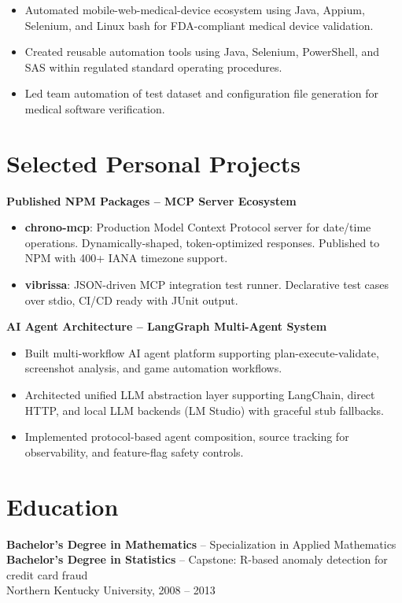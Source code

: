 \documentclass[11pt]{article}
\begin{document}
\begin{itemize}[leftmargin=*,nosep]
\item Automated mobile-web-medical-device ecosystem using Java, Appium, Selenium, and Linux bash for FDA-compliant medical device validation.
\item Created reusable automation tools using Java, Selenium, PowerShell, and SAS within regulated standard operating procedures.
\item Led team automation of test dataset and configuration file generation for medical software verification.
\end{itemize}

\section{Selected Personal Projects}

\textbf{Published NPM Packages -- MCP Server Ecosystem}

\begin{itemize}[leftmargin=*,nosep]
\item \textbf{chrono-mcp}: Production Model Context Protocol server for date/time operations. Dynamically-shaped, token-optimized responses. Published to NPM with 400+ IANA timezone support.
\item \textbf{vibrissa}: JSON-driven MCP integration test runner. Declarative test cases over stdio, CI/CD ready with JUnit output.
\end{itemize}

\textbf{AI Agent Architecture -- LangGraph Multi-Agent System}

\begin{itemize}[leftmargin=*,nosep]
\item Built multi-workflow AI agent platform supporting plan-execute-validate, screenshot analysis, and game automation workflows.
\item Architected unified LLM abstraction layer supporting LangChain, direct HTTP, and local LLM backends (LM Studio) with graceful stub fallbacks.
\item Implemented protocol-based agent composition, source tracking for observability, and feature-flag safety controls.
\end{itemize}

\section{Education}

\textbf{Bachelor's Degree in Mathematics} -- Specialization in Applied Mathematics\\
\textbf{Bachelor's Degree in Statistics} -- Capstone: R-based anomaly detection for credit card fraud\\
Northern Kentucky University, 2008 -- 2013
\end{document}
